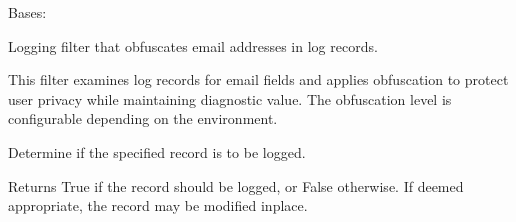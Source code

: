 \documentclass[letterpaper,10pt,openany,oneside,english]{sphinxmanual}
\begin{document}
\begin{savenotes}\begin{fulllineitems}
\label{\detokenize{modules/config:storeapi.logging_conf.EmailObfuscationFilter}}
\pysigstartsignatures
{}
\pysigstopsignatures
\sphinxAtStartPar
Bases: 

\sphinxAtStartPar
Logging filter that obfuscates email addresses in log records.

\sphinxAtStartPar
This filter examines log records for email fields and applies
obfuscation to protect user privacy while maintaining diagnostic value.
The obfuscation level is configurable depending on the environment.

\begin{savenotes}\begin{fulllineitems}
\label{\detokenize{modules/config:storeapi.logging_conf.EmailObfuscationFilter.filter}}
\pysigstartsignatures
{}
\pysigstopsignatures
\sphinxAtStartPar
Determine if the specified record is to be logged.

\sphinxAtStartPar
Returns True if the record should be logged, or False otherwise.
If deemed appropriate, the record may be modified in\sphinxhyphen{}place.

\end{fulllineitems}\end{savenotes}


\end{fulllineitems}\end{savenotes}

\end{document}
